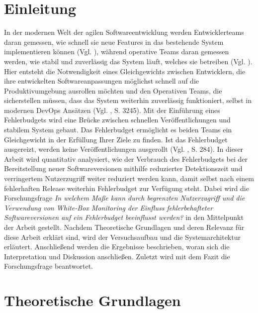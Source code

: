 \documentclass[
12pt,
a4paper,
twoside,
openright
]{report}
\begin{document}
	\chapter{Einleitung}
	In der modernen Welt der agilen Softwareentwicklung werden Entwicklerteams daran gemessen, wie schnell sie neue Features in das bestehende System implementieren können (Vgl. \parencite{DoraDevMetrics}), während operative Teams daran gemessen werden, wie stabil und zuverlässig das System läuft, welches sie betreiben (Vgl. \parencite{vangala2025enhancing}). Hier entsteht die Notwendigkeit eines Gleichgewichts zwischen Entwicklern, die ihre entwickelten Softwareanpassungen möglichst schnell auf die Produktivumgebung ausrollen möchten und den Operativen Teams, die sicherstellen müssen, dass das System weiterhin zuverlässig funktioniert, selbst in modernen DevOps Ansätzen (Vgl. \parencite{TTMReliable}, S. 3245). Mit der Einführung eines Fehlerbudgets wird eine Brücke zwischen schnellen Veröffentlichungen und stabilem System gebaut. Das Fehlerbudget ermöglicht es beiden Teams ein Gleichgewicht in der Erfüllung Ihrer Ziele zu finden. Ist das Fehlerbudget ausgereizt, werden keine Veröffentlichungen ausgerollt (Vgl. \parencite{BenefSRE}, S. 284). In dieser Arbeit wird quantitativ analysiert, wie der Verbrauch des Fehlerbudgets bei der Bereitstellung neuer Softwareversionen mithilfe reduzierter Detektionszeit und verringertem Nutzerzugriff weiter reduziert werden kann, damit selbst nach einem fehlerhaften Release weiterhin Fehlerbudget zur Verfügung steht. Dabei wird die Forschungsfrage \textit{In welchem Maße kann durch begrenzten Nutzerzugriff und die Verwendung von White-Box Monitoring der Einfluss fehlerbehafteter Softwareversionen auf ein Fehlerbudget beeinflusst werden?} in den Mittelpunkt der Arbeit gestellt. Nachdem Theoretische Grundlagen und deren Relevanz für diese Arbeit erklärt sind, wird der Versuchsaufbau und die Systemarchitektur erläutert. Anschließend werden die Ergebnisse beschrieben, woran sich die Interpretation und Diskussion anschließen. Zuletzt wird mit dem Fazit die Forschungsfrage beantwortet.
	
	\chapter{Theoretische Grundlagen}
	
\end{document}
